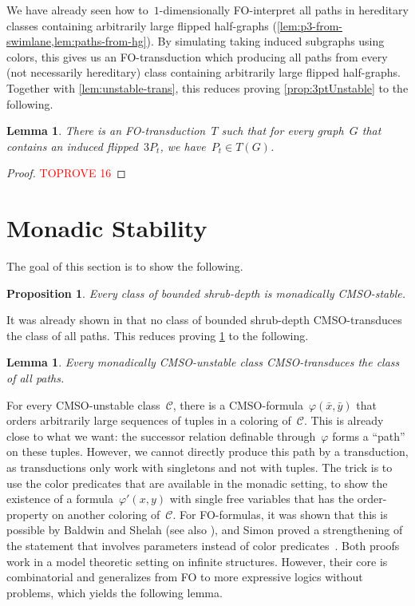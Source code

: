 \documentclass[11pt]{article}      \usepackage[margin=1in]{geometry}  \usepackage{microtype}
\newtheorem{lemma}[theorem]{Lemma}
\newtheorem{proposition}[theorem]{Proposition}
\theoremstyle{definition}
\renewcommand{\phi}{\varphi}
\newcommand{\CC}{\mathcal{C}}
\begin{document}
We have already seen how to~$1$-dimensionally FO-interpret all paths in hereditary classes containing arbitrarily large flipped half-graphs (\cref{lem:p3-from-swimlane,lem:paths-from-hg}). By simulating taking induced subgraphs using colors, this gives us an FO-transduction which producing all paths from every (not necessarily hereditary) class containing arbitrarily large flipped half-graphs. 
Together with \cref{lem:unstable-trans}, this reduces proving \cref{prop:3ptUnstable} to the following.

\begin{lemma}
\label{prop:3ptToPaths}
There is an FO-transduction~$T$ such that for every graph~$G$ that contains an induced flipped~$3P_t$, we have~$P_t \in T(G)$.
\end{lemma}

\begin{proof}\textcolor{red}{TOPROVE 16}\end{proof} 
\section{Monadic Stability}\label{sec:mstable}
The goal of this section is to show the following.

\begin{proposition}\label{prop:sd-implies-mcmso-stable}
    Every class of bounded shrub-depth is monadically CMSO-stable.
\end{proposition}

It was already shown in \cite{shrubdepth-journal} that no class of bounded shrub-depth CMSO-transduces the class of all paths.
This reduces proving \cref{prop:sd-implies-mcmso-stable} to the following.

\begin{lemma}\label{prop:cmso-transductions}
    Every monadically CMSO-unstable class CMSO-transduces the class of all paths.
\end{lemma}


For every CMSO-unstable class~$\CC$, there is a CMSO-formula~$\phi(\bar x, \bar y)$ that orders arbitrarily large sequences of tuples in a coloring of~$\CC$.
This is already close to what we want: the successor relation definable through~$\phi$ forms a ``path'' on these tuples.
However, we cannot directly produce this path by a transduction, as transductions only work with singletons and not with tuples.
The trick is to use the color predicates that are available in the monadic setting, to show the existence of a formula~$\phi'(x,y)$ with single free variables that has the order-property on another coloring of~$\CC$.
For FO-formulas, it was shown that this is possible by Baldwin and Shelah \cite[Lem.\ 8.1.3]{baldwin1985second} (see also \mbox{\cite[Thm.\ 2.2]{anderson1990tree}}), and Simon proved a strengthening of the statement that involves parameters instead of color predicates~\cite{simon2021note}.
Both proofs work in a model theoretic setting on infinite structures.
However, their core is combinatorial and generalizes from FO to more expressive logics without problems, which yields the following lemma.
\end{document}
